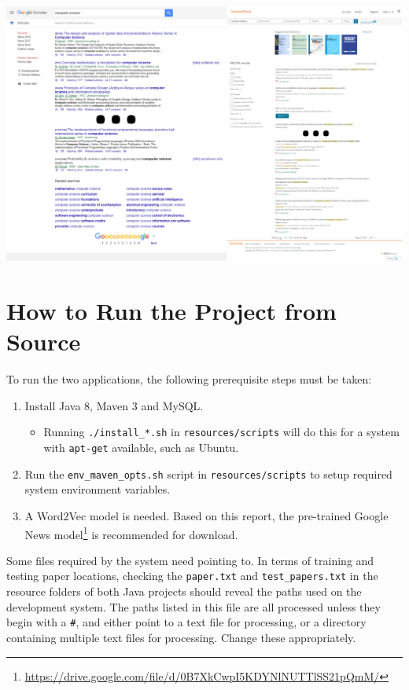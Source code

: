 \begin{appendices}
\includegraphics[width=\textwidth]{img/searchexamples.png}

\chapter{How to Run the Project from Source}
\label{appendix:howtorun}

To run the two applications, the following prerequisite steps must be taken:
\begin{enumerate}
	\item Install Java 8, Maven 3 and MySQL.
	\begin{itemize}
		\item Running \texttt{./install\_*.sh} in \texttt{resources/scripts} will do this for a system with \texttt{apt-get} available, such as Ubuntu.
	\end{itemize}
	\item Run the \texttt{env\_maven\_opts.sh} script in \texttt{resources/scripts} to setup required system environment variables.
	\item A Word2Vec model is needed. Based on this report, the pre-trained Google News model\footnote{\href{https://drive.google.com/file/d/0B7XkCwpI5KDYNlNUTTlSS21pQmM/}{https://drive.google.com/file/d/0B7XkCwpI5KDYNlNUTTlSS21pQmM/}} is recommended for download.
\end{enumerate}

\noindent Some files required by the system need pointing to. 
In terms of training and testing paper locations, checking the \texttt{paper.txt} and \texttt{test\_papers.txt} in the resource folders of both Java projects should reveal the paths used on the development system. The paths listed in this file are all processed unless they begin with a \texttt{\#}, and either point to a text file for processing, or a directory containing multiple text files for processing. Change these appropriately. 


\end{appendices}
